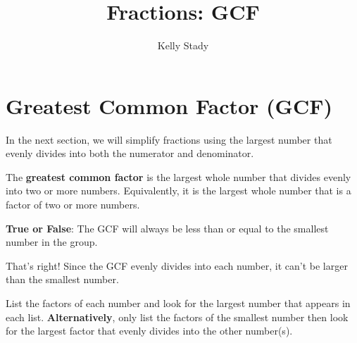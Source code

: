 \documentclass{ximera}[font=12pt]  %
\title{Fractions: GCF}   %
\author{Kelly Stady}
\begin{document}
\begin{abstract}

\end{abstract}

\maketitle

\label{xim:FracsGCFSimplify}


\section*{Greatest Common Factor (GCF)}

In the next section, we will simplify fractions using the largest number that evenly divides into both the numerator and denominator. 

\begin{definition}
The \textbf{greatest common factor} is the largest whole number that divides evenly into two or more numbers.  Equivalently, it is
the largest whole number that is a factor of two or more numbers.

\end{definition}


\begin{problem} \textcolor{ximeraorange!80!black}{\textbf{True or False}}:  The GCF will always be less than or equal to the smallest 
    number in the group.

\begin{multipleChoice}
\end{multipleChoice}

\begin{feedback}[correct]
That's right!  Since the GCF evenly divides into each number, it can't be larger than the smallest number.
\end{feedback}

\end{problem}


\begin{procedure}

List the factors of each number and look for the largest number that appears in each list.  \textbf{Alternatively}, 
only list the factors of the smallest number then look for the largest factor that evenly divides into the other number(s).

\end{procedure}
\end{document}
